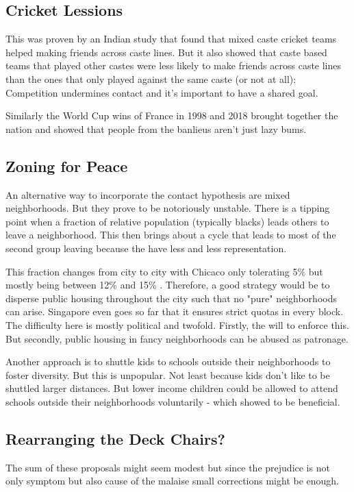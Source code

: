 \documentclass[a4paper, twocolumn]{article}
\begin{document}
\subsection{Cricket Lessions}
This was proven by an Indian study \cite{cricket-study} that found that mixed caste cricket teams helped making friends across caste lines. But it also showed that caste based teams that played other castes were less likely to make friends across caste lines than the ones that only played against the same caste (or not at all): Competition undermines contact and it's important to have a shared goal.

Similarly the World Cup wins of France in 1998 and 2018 brought together the nation and showed that people from the banlieus aren't just lazy bums.

\subsection{Zoning for Peace}
An alternative way to incorporate the contact hypothesis are mixed neighborhoods. But they prove to be notoriously unstable. There is a tipping point when a fraction of relative population (typically blacks) leads others to leave a neighborhood. This then brings about a cycle that leads to most of the second group leaving because the have less and less representation.

This fraction changes from city to city with Chicaco only tolerating 5\% but mostly being between 12\% and 15\% \cite{tipping-point}. Therefore, a good strategy would be to disperse public housing throughout the city such that no "pure" neighborhoods can arise. Singapore even goes so far that it ensures strict quotas in every block. The difficulty here is mostly political and twofold. Firstly, the will to enforce this. But secondly, public housing in fancy neighborhoods can be abused as patronage.

Another approach is to shuttle kids to schools outside their neighborhoods to foster diversity. But this is unpopular. Not least because kids don't like to be shuttled larger distances. But lower income children could be allowed to attend schools outside their neighborhoods voluntarily - which showed to be beneficial.

\subsection{Rearranging the Deck Chairs?}
The sum of these proposals might seem modest but since the prejudice is not only symptom but also cause of the malaise small corrections might be enough.
\end{document}
